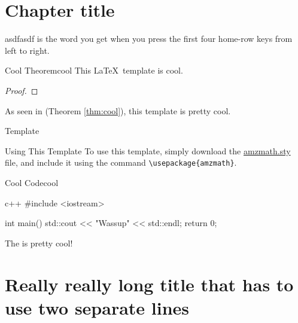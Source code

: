 \documentclass[12pt]{report}
\begin{document}
    \chapter{Chapter title}

    \lipsum[1]

    \begin{dfnbox}{asdf}{asdf}
         is the word you get when you press the first four home-row keys from left to right.
    \end{dfnbox}

    \begin{thmbox}{Cool Theorem}{cool}
        This \LaTeX\ template is cool.
        \tcblower
        \begin{proof}
            \lipsum[1]
        \end{proof}
    \end{thmbox}

    As seen in  (Theorem \ref{thm:cool}), this template is pretty cool.

    \begin{exbox}{Template}{}
        \lipsum[1]
    \end{exbox}

    \begin{tecbox}{Using This Template}{}
        To use this template, simply download the \href{https://raw.githubusercontent.com/alexmingzhang/latex-notes-template/main/amzmath.sty}{amzmath.sty} file, and include it using the command \verb|\usepackage{amzmath}|.
    \end{tecbox}

    \begin{codebox}{Cool Code}{cool}
        \begin{amzcode}{c++}
            #include <iostream>

            int main() {
                std::cout << "Wassup" << std::endl;
                return 0;
            }
        \end{amzcode}
    \end{codebox}

    The  is pretty cool!

    \chapter{Really really long title that has to use two separate lines}

    \makeamzindex
\end{document}
